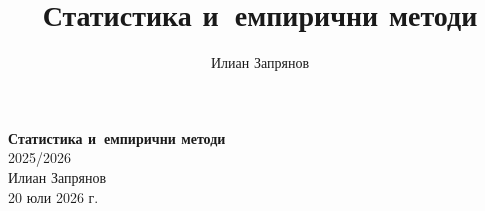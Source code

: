 \documentclass[11pt,a4paper]{book}
\title{\textcolor{ChapterAccent}{\Huge Статистика и~емпирични методи}}
\author{Илиан Запрянов}
\date{}
\begin{document}
\begin{titlepage}
\centering
\vspace*{3cm}
{\Huge\bfseries\color{ChapterAccent} Статистика и~емпирични методи}\\[0.5em]
{\Large\color{ChapterAccent!70!black} 2025/2026}\\[2cm]
{\large Илиан Запрянов}\\[2cm]
{\large 20 юли 2026 г.}
\vfill
\end{titlepage}

\tableofcontents

















\end{document}
